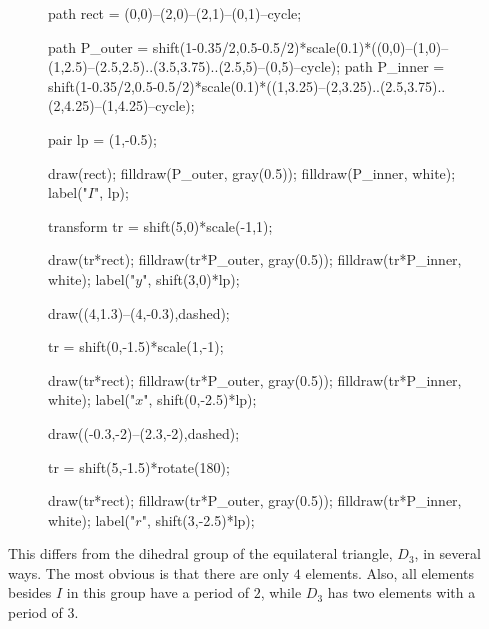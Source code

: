 \documentclass[../key.tex]{subfiles}
\begin{document}
\begin{figure}[h]
	\begin{center}
		\begin{minipage}[b]{\textwidth}
			\centering
			\begin{asy}[width=0.5\textwidth]
			path rect = (0,0)--(2,0)--(2,1)--(0,1)--cycle;
			
			path P_outer = shift(1-0.35/2,0.5-0.5/2)*scale(0.1)*((0,0)--(1,0)--(1,2.5)--(2.5,2.5)..(3.5,3.75)..(2.5,5)--(0,5)--cycle);
			path P_inner = shift(1-0.35/2,0.5-0.5/2)*scale(0.1)*((1,3.25)--(2,3.25)..(2.5,3.75)..(2,4.25)--(1,4.25)--cycle);
			
			pair lp = (1,-0.5);
			
			draw(rect);
			filldraw(P_outer, gray(0.5));
			filldraw(P_inner, white);
			label("$I$", lp);
			
			transform tr = shift(5,0)*scale(-1,1);
			
			draw(tr*rect);
			filldraw(tr*P_outer, gray(0.5));
			filldraw(tr*P_inner, white);
			label("$y$", shift(3,0)*lp);
			
			draw((4,1.3)--(4,-0.3),dashed);
			
			tr = shift(0,-1.5)*scale(1,-1);
			
			draw(tr*rect);
			filldraw(tr*P_outer, gray(0.5));
			filldraw(tr*P_inner, white);
			label("$x$", shift(0,-2.5)*lp);
			
			draw((-0.3,-2)--(2.3,-2),dashed);
			
			tr = shift(5,-1.5)*rotate(180);
			
			draw(tr*rect);
			filldraw(tr*P_outer, gray(0.5));
			filldraw(tr*P_inner, white);
			label("$r$", shift(3,-2.5)*lp);
			\end{asy}
		\end{minipage}
	\end{center}
	\vspace*{-2\baselineskip}
	\begin{center}
		\begin{minipage}[t]{\textwidth}
			\label{fig:p_rectangle}
		\end{minipage}
	\end{center}
	\vspace*{-2\baselineskip}
\end{figure}

\noindent This differs from the dihedral group of the equilateral triangle, $D_3$, in several ways. The most obvious is that there are only $4$ elements. Also, all elements besides $I$ in this group have a period of $2$, while $D_3$ has two elements with a period of $3$.
\end{document}

